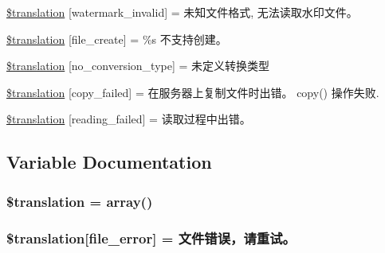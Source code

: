 \begin{DoxyCompactItemize}
\hyperlink{class_8upload_8zh___c_n_8php_ac336e7a5701e47ba4a05e9e498a3cc44}{\$translation} \mbox{[}\textquotesingle{}watermark\+\_\+invalid\textquotesingle{}\mbox{]} = \textquotesingle{}未知文件格式, 无法读取水印文件。\textquotesingle{}
\item 
\hyperlink{class_8upload_8zh___c_n_8php_a1ecb4673e4fb69e06b3f20b65cecf30a}{\$translation} \mbox{[}\textquotesingle{}file\+\_\+create\textquotesingle{}\mbox{]} = \textquotesingle{}\%s 不支持创建。\textquotesingle{}
\item 
\hyperlink{class_8upload_8zh___c_n_8php_a4712d7ec28e9a7f17eb3338af2358363}{\$translation} \mbox{[}\textquotesingle{}no\+\_\+conversion\+\_\+type\textquotesingle{}\mbox{]} = \textquotesingle{}未定义转换类型\textquotesingle{}
\item 
\hyperlink{class_8upload_8zh___c_n_8php_a783c9358bcf54a054545b50098bc679b}{\$translation} \mbox{[}\textquotesingle{}copy\+\_\+failed\textquotesingle{}\mbox{]} = \textquotesingle{}在服务器上复制文件时出错。 copy() 操作失败.\textquotesingle{}
\item 
\hyperlink{class_8upload_8zh___c_n_8php_a01bea14c9fd5f353f62db44beabfcd42}{\$translation} \mbox{[}\textquotesingle{}reading\+\_\+failed\textquotesingle{}\mbox{]} = \textquotesingle{}读取过程中出错。\textquotesingle{}
\end{DoxyCompactItemize}


\subsection{Variable Documentation}
\hypertarget{class_8upload_8zh___c_n_8php_a1f198d410fecc3871ebdd468d343a5e3}{}
\subsubsection[{\$translation}]{\setlength{\rightskip}{0pt plus 5cm}\$translation = array()}\label{class_8upload_8zh___c_n_8php_a1f198d410fecc3871ebdd468d343a5e3}
\hypertarget{class_8upload_8zh___c_n_8php_ac7498e49b9771b04698029aa61c70821}{}
\subsubsection[{\$translation}]{\setlength{\rightskip}{0pt plus 5cm}\$translation\mbox{[}\textquotesingle{}file\+\_\+error\textquotesingle{}\mbox{]} = \textquotesingle{}文件错误，请重试。\textquotesingle{}}\label{class_8upload_8zh___c_n_8php_ac7498e49b9771b04698029aa61c70821}
\hypertarget{class_8upload_8zh___c_n_8php_a6ec3d3a47ab70d77e7aa593e82ead10e}{}
